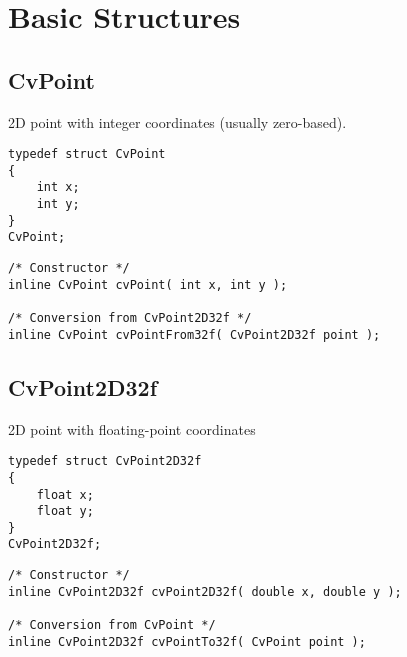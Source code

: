 \section{Basic Structures}


\ifCPy
\subsection{CvPoint}\label{CvPoint}
2D point with integer coordinates (usually zero-based).

\begin{lstlisting}
typedef struct CvPoint
{
    int x; 
    int y; 
}
CvPoint;
\end{lstlisting}

\begin{description}
\end{description}

\begin{lstlisting}
/* Constructor */
inline CvPoint cvPoint( int x, int y );

/* Conversion from CvPoint2D32f */
inline CvPoint cvPointFrom32f( CvPoint2D32f point );
\end{lstlisting}


\subsection{CvPoint2D32f}\label{CvPoint2D32f}
2D point with floating-point coordinates

\begin{lstlisting}
typedef struct CvPoint2D32f
{
    float x;
    float y; 
}
CvPoint2D32f;
\end{lstlisting}

\begin{description}
\end{description}

\begin{lstlisting}
/* Constructor */
inline CvPoint2D32f cvPoint2D32f( double x, double y );

/* Conversion from CvPoint */
inline CvPoint2D32f cvPointTo32f( CvPoint point );
\end{lstlisting}


